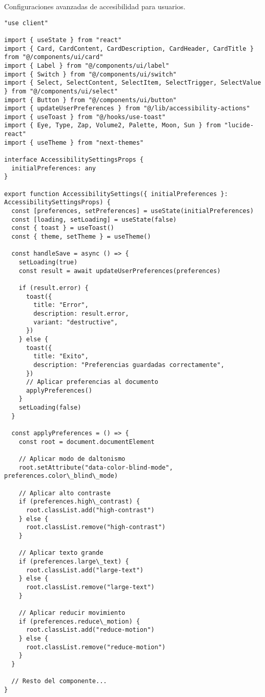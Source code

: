\documentclass[12pt,a4paper]{article}
\begin{document}
Configuraciones avanzadas de accesibilidad para usuarios.

\begin{lstlisting}[caption=components/accessibility/accessibility-settings.tsx - Estructura principal]
"use client"

import { useState } from "react"
import { Card, CardContent, CardDescription, CardHeader, CardTitle } from "@/components/ui/card"
import { Label } from "@/components/ui/label"
import { Switch } from "@/components/ui/switch"
import { Select, SelectContent, SelectItem, SelectTrigger, SelectValue } from "@/components/ui/select"
import { Button } from "@/components/ui/button"
import { updateUserPreferences } from "@/lib/accessibility-actions"
import { useToast } from "@/hooks/use-toast"
import { Eye, Type, Zap, Volume2, Palette, Moon, Sun } from "lucide-react"
import { useTheme } from "next-themes"

interface AccessibilitySettingsProps {
  initialPreferences: any
}

export function AccessibilitySettings({ initialPreferences }: AccessibilitySettingsProps) {
  const [preferences, setPreferences] = useState(initialPreferences)
  const [loading, setLoading] = useState(false)
  const { toast } = useToast()
  const { theme, setTheme } = useTheme()

  const handleSave = async () => {
    setLoading(true)
    const result = await updateUserPreferences(preferences)

    if (result.error) {
      toast({
        title: "Error",
        description: result.error,
        variant: "destructive",
      })
    } else {
      toast({
        title: "Exito",
        description: "Preferencias guardadas correctamente",
      })
      // Aplicar preferencias al documento
      applyPreferences()
    }
    setLoading(false)
  }

  const applyPreferences = () => {
    const root = document.documentElement

    // Aplicar modo de daltonismo
    root.setAttribute("data-color-blind-mode", preferences.color\_blind\_mode)

    // Aplicar alto contraste
    if (preferences.high\_contrast) {
      root.classList.add("high-contrast")
    } else {
      root.classList.remove("high-contrast")
    }

    // Aplicar texto grande
    if (preferences.large\_text) {
      root.classList.add("large-text")
    } else {
      root.classList.remove("large-text")
    }

    // Aplicar reducir movimiento
    if (preferences.reduce\_motion) {
      root.classList.add("reduce-motion")
    } else {
      root.classList.remove("reduce-motion")
    }
  }

  // Resto del componente...
}
\end{lstlisting}
\end{document}
